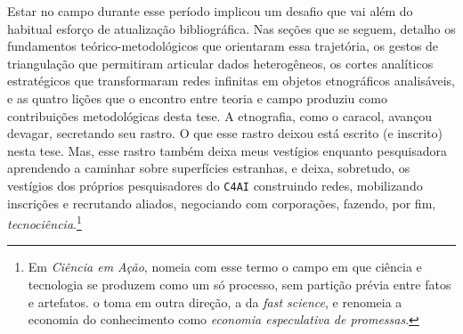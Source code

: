 Estar no campo durante esse período implicou um desafio que vai além do habitual esforço de atualização bibliográfica. Nas seções que se seguem, detalho os fundamentos teórico-metodológicos que orientaram essa trajetória, os gestos de triangulação que permitiram articular dados heterogêneos, os cortes analíticos estratégicos que transformaram redes infinitas em objetos etnográficos analisáveis, e as quatro lições que o encontro entre teoria e campo produziu como contribuições metodológicas desta tese. A etnografia, como o caracol, avançou devagar, secretando seu rastro. O que esse rastro deixou está escrito (e inscrito) nesta tese. Mas, esse rastro também deixa meus vestígios enquanto pesquisadora aprendendo a caminhar sobre superfícies estranhas, e deixa, sobretudo, os vestígios dos próprios pesquisadores do \texttt{C4AI} construindo redes, mobilizando inscrições e recrutando aliados, negociando com corporações, fazendo, por fim, \textit{tecnociência}.\footnote{Em \textit{Ciência em Ação}, \textcite{Latour2011CienciaEmAcao} nomeia com esse termo o campo em que ciência e tecnologia se produzem como um só processo, sem partição prévia entre fatos e artefatos. \textcite{stengers2018another} o toma em outra direção, a da \textit{fast science}, e renomeia a economia do conhecimento como \textit{economia especulativa de promessas}.}

